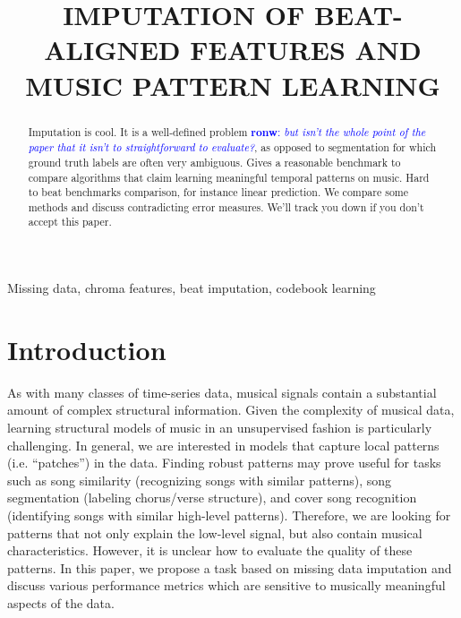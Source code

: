 \documentclass{article}
\title{IMPUTATION OF BEAT-ALIGNED FEATURES AND MUSIC PATTERN LEARNING}
\newcommand{\FIXME}[2][FIXME]{\textcolor{blue}{\textbf{#1}: \emph{#2}}}
\begin{document}
\ninept
%
\maketitle
%
\begin{abstract}
Imputation is cool. It is a well-defined problem
\FIXME[ronw]{but isn't the whole point of the paper
that it isn't to straightforward to evaluate?},
as opposed to segmentation for which ground truth labels are often
very ambiguous.
%
Gives a reasonable benchmark to compare algorithms that claim learning meaningful
temporal patterns on music. Hard to beat benchmarks comparison, for instance linear
prediction. We compare some methods and discuss contradicting error measures. 
We'll track you down if you don't accept this paper.
\end{abstract}
%
\begin{keywords}
Missing data, chroma features, beat imputation, codebook learning
\end{keywords}
%


\section{Introduction}
\label{sec:intro}
As with many classes of time-series data, musical signals contain a
substantial amount of complex structural information.  Given the
complexity of musical data, learning structural models of music in an
unsupervised fashion is particularly challenging.  In general, we are
interested in models that capture local patterns (i.e. ``patches'') in
the data.  Finding robust patterns may prove useful for tasks such as
song similarity (recognizing songs with similar patterns), song
segmentation (labeling chorus/verse structure), and cover song
recognition (identifying songs with similar high-level patterns).
Therefore, we are looking for patterns that not only explain the
low-level signal, but also contain musical characteristics.  However,
it is unclear how to evaluate the quality of these patterns.  In this
paper, we propose a task based on missing data imputation and discuss
various performance metrics which are sensitive to musically
meaningful aspects of the data.
\end{document}
